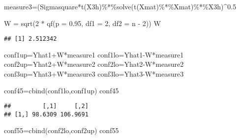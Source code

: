 \documentclass[
]{article}
\newenvironment{Shaded}{\begin{snugshade}}{\end{snugshade}}
\newcommand{\AttributeTok}[1]{\textcolor[rgb]{0.77,0.63,0.00}{#1}}
\newcommand{\DecValTok}[1]{\textcolor[rgb]{0.00,0.00,0.81}{#1}}
\newcommand{\FloatTok}[1]{\textcolor[rgb]{0.00,0.00,0.81}{#1}}
\newcommand{\FunctionTok}[1]{\textcolor[rgb]{0.00,0.00,0.00}{#1}}
\newcommand{\NormalTok}[1]{#1}
\newcommand{\OtherTok}[1]{\textcolor[rgb]{0.56,0.35,0.01}{#1}}
\newcommand{\SpecialCharTok}[1]{\textcolor[rgb]{0.00,0.00,0.00}{#1}}
\begin{document}
\begin{Shaded}
\begin{Highlighting}[]
\NormalTok{measure3}\OtherTok{=}\NormalTok{(Sigmasquare}\SpecialCharTok{*}\FunctionTok{t}\NormalTok{(X3h)}\SpecialCharTok{\%*\%}\FunctionTok{solve}\NormalTok{(}\FunctionTok{t}\NormalTok{(Xmat)}\SpecialCharTok{\%*\%}\NormalTok{Xmat)}\SpecialCharTok{\%*\%}\NormalTok{X3h)}\SpecialCharTok{\^{}}\FloatTok{0.5}

\NormalTok{W }\OtherTok{=} \FunctionTok{sqrt}\NormalTok{(}\DecValTok{2} \SpecialCharTok{*} \FunctionTok{qf}\NormalTok{(}\AttributeTok{p =} \FloatTok{0.95}\NormalTok{, }\AttributeTok{df1 =} \DecValTok{2}\NormalTok{, }\AttributeTok{df2 =}\NormalTok{ n }\SpecialCharTok{{-}} \DecValTok{2}\NormalTok{))}
\NormalTok{W}
\end{Highlighting}
\end{Shaded}

\begin{verbatim}
## [1] 2.512342
\end{verbatim}

\begin{Shaded}
\begin{Highlighting}[]
\NormalTok{conf1up}\OtherTok{=}\NormalTok{Yhat1}\SpecialCharTok{+}\NormalTok{W}\SpecialCharTok{*}\NormalTok{measure1 }
\NormalTok{conf1lo}\OtherTok{=}\NormalTok{Yhat1}\SpecialCharTok{{-}}\NormalTok{W}\SpecialCharTok{*}\NormalTok{measure1  }
\NormalTok{conf2up}\OtherTok{=}\NormalTok{Yhat2}\SpecialCharTok{+}\NormalTok{W}\SpecialCharTok{*}\NormalTok{measure2 }
\NormalTok{conf2lo}\OtherTok{=}\NormalTok{Yhat2}\SpecialCharTok{{-}}\NormalTok{W}\SpecialCharTok{*}\NormalTok{measure2  }
\NormalTok{conf3up}\OtherTok{=}\NormalTok{Yhat3}\SpecialCharTok{+}\NormalTok{W}\SpecialCharTok{*}\NormalTok{measure3  }
\NormalTok{conf3lo}\OtherTok{=}\NormalTok{Yhat3}\SpecialCharTok{{-}}\NormalTok{W}\SpecialCharTok{*}\NormalTok{measure3  }

\NormalTok{conf45}\OtherTok{=}\FunctionTok{cbind}\NormalTok{(conf1lo,conf1up)}
\NormalTok{conf45}
\end{Highlighting}
\end{Shaded}

\begin{verbatim}
##         [,1]     [,2]
## [1,] 98.6309 106.9691
\end{verbatim}

\begin{Shaded}
\begin{Highlighting}[]
\NormalTok{conf55}\OtherTok{=}\FunctionTok{cbind}\NormalTok{(conf2lo,conf2up)}
\NormalTok{conf55}
\end{Highlighting}
\end{Shaded}
\end{document}
